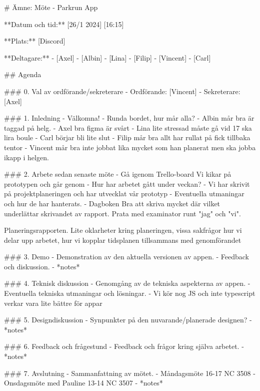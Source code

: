 # Ämne: Möte - Parkrun App

**Datum och tid:** [26/1 2024] [16:15]

**Plats:** [Discord]

**Deltagare:**
- [Axel]
- [Albin]
- [Lina]
- [Filip]
- [Vincent]
- [Carl]


## Agenda

### 0. Val av ordförande/sekreterare
- Ordförande: [Vincent]
- Sekreterare: [Axel]

### 1. Inledning
   - Välkomna!
   - Runda bordet, hur mår alla?
     - Albin mår bra är taggad på helg.
     - Axel bra figma är svårt
     - Lina lite stressad måste gå vid 17 ska lira boule
     - Carl börjar bli lite slut
     - Filip mår bra allt har rullat på fick tillbaka tentor
     - Vincent mår bra inte jobbat lika mycket som han planerat men ska jobba ikapp i helgen. 

### 2. Arbete sedan senaste möte
   - Gå igenom Trello-board
    Vi kikar på prototypen och går genom
   - Hur har arbetet gått under veckan?
       - Vi har skrivit på projektplaneringen och har utvecklat vår prototyp
   - Eventuella utmaningar och hur de har hanterats.
       - Dagboken
            Bra att skriva mycket där vilket underlättar skrivandet av rapport. 
            Prata med examinator runt "jag" och "vi".

    Planeringsrapporten.
        Lite oklarheter kring planeringen, vissa sakfrågor hur vi delar upp arbetet, hur vi kopplar tidsplanen tillsammans med genomförandet
        

### 3. Demo
   - Demonstration av den aktuella versionen av appen.
   - Feedback och diskussion.
       - *notes*

### 4. Teknisk diskussion
   - Genomgång av de tekniska aspekterna av appen.
   - Eventuella tekniska utmaningar och lösningar.
       - Vi kör nog JS och inte typescript verkar vara lite bättre för appar

### 5. Designdiskussion
   - Synpunkter på den nuvarande/planerade designen?
       - *notes*

### 6. Feedback och frågestund
   - Feedback och frågor kring själva arbetet.
       - *notes*

### 7. Avslutning
   - Sammanfattning av mötet.
        - Måndagsmöte 16-17 NC 3508
        - Onsdagsmöte med Pauline 13-14 NC 3507
       - *notes*
